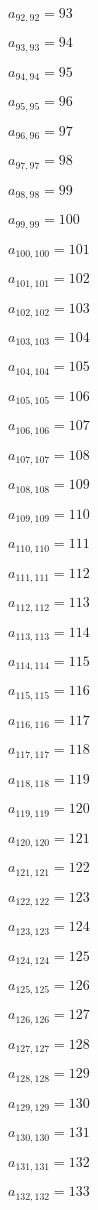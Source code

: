 \documentclass[a4paper,12pt]{article}
\begin{document}
$a _{ 92, 92 } = 93$

$a _{ 93, 93 } = 94$

$a _{ 94, 94 } = 95$

$a _{ 95, 95 } = 96$

$a _{ 96, 96 } = 97$

$a _{ 97, 97 } = 98$

$a _{ 98, 98 } = 99$

$a _{ 99, 99 } = 100$

$a _{ 100, 100 } = 101$

$a _{ 101, 101 } = 102$

$a _{ 102, 102 } = 103$

$a _{ 103, 103 } = 104$

$a _{ 104, 104 } = 105$

$a _{ 105, 105 } = 106$

$a _{ 106, 106 } = 107$

$a _{ 107, 107 } = 108$

$a _{ 108, 108 } = 109$

$a _{ 109, 109 } = 110$

$a _{ 110, 110 } = 111$

$a _{ 111, 111 } = 112$

$a _{ 112, 112 } = 113$

$a _{ 113, 113 } = 114$

$a _{ 114, 114 } = 115$

$a _{ 115, 115 } = 116$

$a _{ 116, 116 } = 117$

$a _{ 117, 117 } = 118$

$a _{ 118, 118 } = 119$

$a _{ 119, 119 } = 120$

$a _{ 120, 120 } = 121$

$a _{ 121, 121 } = 122$

$a _{ 122, 122 } = 123$

$a _{ 123, 123 } = 124$

$a _{ 124, 124 } = 125$

$a _{ 125, 125 } = 126$

$a _{ 126, 126 } = 127$

$a _{ 127, 127 } = 128$

$a _{ 128, 128 } = 129$

$a _{ 129, 129 } = 130$

$a _{ 130, 130 } = 131$

$a _{ 131, 131 } = 132$

$a _{ 132, 132 } = 133$
\end{document}
